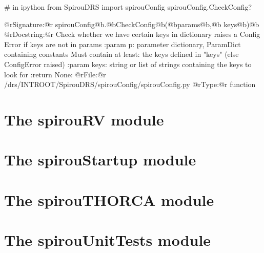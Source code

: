 \begin{minipage}{\textwidth}
\begin{pythonbox}
# in ipython
from SpirouDRS import spirouConfig
spirouConfig.CheckConfig?
\end{pythonbox}
\vspace{-0.25cm}
\begin{cmdboxprintspecial}
@rSignature:@r spirouConfig@b.@bCheckConfig@b(@bparams@b,@b keys@b)@b
@rDocstring:@r
Check whether we have certain keys in dictionary
raises a Config Error if keys are not in params
:param p: parameter dictionary, ParamDict containing constants
    Must contain at least:
        the keys defined in "keys" (else ConfigError raised)
:param keys: string or list of strings containing the keys to look for
:return None:
@rFile:@r      /drs/INTROOT/SpirouDRS/spirouConfig/spirouConfig.py
@rType:@r      function
\end{cmdboxprintspecial}
\end{minipage}


















\section{The spirouRV module}
\label{ch:the_module:spirouRV}


\section{The spirouStartup module}
\label{ch:the_module:spirouStartup}


\section{The spirouTHORCA module}
\label{ch:the_module:spirouTHORCA}


\section{The spirouUnitTests module}
\label{ch:the_module:spirouUnitTests}
